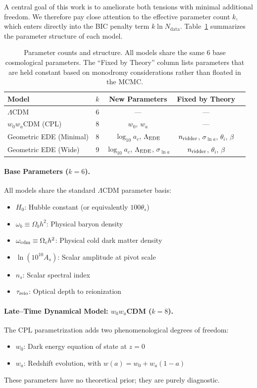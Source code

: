 \documentclass[a4paper,11pt]{article}
\begin{document}
A central goal of this work is to ameliorate both tensions with minimal additional freedom. We therefore pay close attention to the effective parameter count $k$, which enters directly into the BIC penalty term $k \ln N_{\mathrm{data}}$. Table~\ref{tab:param_counts} summarizes the parameter structure of each model.

\begin{table}[h]
\centering
\caption{Parameter counts and structure. All models share the same 6 base cosmological parameters. The ``Fixed by Theory'' column lists parameters that are held constant based on monodromy considerations rather than floated in the MCMC.}
\label{tab:param_counts}
\begin{tabular}{lcccc}
\toprule
Model & $k$ & New Parameters & Fixed by Theory \\
\midrule
$\Lambda$CDM & 6 & --- & --- \\
$w_0w_a$CDM (CPL) & 8 & $w_0$, $w_a$ & --- \\
Geometric EDE (Minimal) & 8 & $\log_{10}a_c$, $\Lambda_{\rm EDE}$ & $n_{\rm ridder}$, $\sigma_{\ln a}$, $\theta_i$, $\beta$ \\
Geometric EDE (Wide) & 9 & $\log_{10}a_c$, $\Lambda_{\rm EDE}$, $\sigma_{\ln a}$ & $n_{\rm ridder}$, $\theta_i$, $\beta$ \\
\bottomrule
\end{tabular}
\end{table}

\paragraph{Base Parameters ($k = 6$).}
All models share the standard $\Lambda$CDM parameter basis:
\begin{itemize}
    \item $H_0$: Hubble constant (or equivalently $100\theta_s$)
    \item $\omega_b \equiv \Omega_b h^2$: Physical baryon density
    \item $\omega_{\rm cdm} \equiv \Omega_c h^2$: Physical cold dark matter density
    \item $\ln(10^{10}A_s)$: Scalar amplitude at pivot scale
    \item $n_s$: Scalar spectral index
    \item $\tau_{\rm reio}$: Optical depth to reionization
\end{itemize}

\paragraph{Late--Time Dynamical Model: $w_0 w_a$CDM ($k = 8$).}
The CPL parametrization adds two phenomenological degrees of freedom:
\begin{itemize}
    \item $w_0$: Dark energy equation of state at $z = 0$
    \item $w_a$: Redshift evolution, with $w(a) = w_0 + w_a(1 - a)$
\end{itemize}
These parameters have no theoretical prior; they are purely diagnostic.
\end{document}

